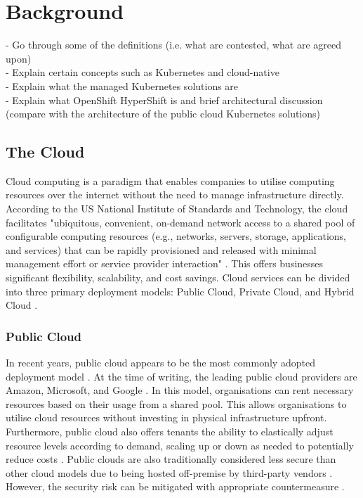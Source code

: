 \chapter{Background}

- Go through some of the definitions (i.e. what are contested, what are agreed upon)\\
- Explain certain concepts such as Kubernetes and cloud-native\\
- Explain what the managed Kubernetes solutions are\\
- Explain what OpenShift HyperShift is and brief architectural discussion (compare with the architecture of the public cloud Kubernetes solutions)\\

\section{The Cloud}

Cloud computing is a paradigm that enables companies to utilise computing resources over the internet without the need to manage infrastructure directly. According to the US National Institute of Standards and Technology, the cloud facilitates "ubiquitous, convenient, on-demand network access to a shared pool of configurable computing resources (e.g., networks, servers, storage, applications, and services) that can be rapidly provisioned and released with minimal management effort or service provider interaction" \cite{editorCloudComputingGlossary}. This offers businesses significant flexibility, scalability, and cost savings. Cloud services can be divided into three primary deployment models: Public Cloud, Private Cloud, and Hybrid Cloud \cite{ramgovind2010management}.

\subsection{Public Cloud}

In recent years, public cloud appears to be the most commonly adopted deployment model \cite{CNCFAnnualSurvey2024, opara2016critical}. At the time of writing, the leading public cloud providers are Amazon, Microsoft, and Google \cite{2024StateCloud}. In this model, organisations can rent necessary resources based on their usage from a shared pool. This allows organisations to utilise cloud resources without investing in physical infrastructure upfront. Furthermore, public cloud also offers tenants the ability to elastically adjust resource levels according to demand, scaling up or down as needed to potentially reduce costs \cite{suleiman2012understanding}. Public clouds are also traditionally considered less secure than other cloud models due to being hosted off-premise by third-party vendors \cite{sakr2011survey}. However, the security risk can be mitigated with appropriate countermeasure \cite{fox2009above}.


